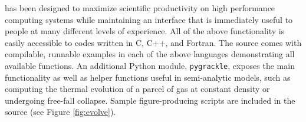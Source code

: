 \grackle{} has been designed to maximize scientific productivity on
high performance computing systems while maintaining an interface that
is immediately useful to people at many different levels of
experience.
All of the above functionality is easily accessible to codes written
in C, C++, and Fortran.  The source comes with compilable,
runnable examples in each of the above languages demonstrating all
available functions.  An additional Python module, \texttt{pygrackle},
exposes the main functionality as well as helper functions useful in
semi-analytic models, such as computing the
thermal evolution of a parcel of gas at constant density or undergoing
free-fall collapse.  Sample figure-producing scripts
are included in the source (see Figure \ref{fig:evolve}).



